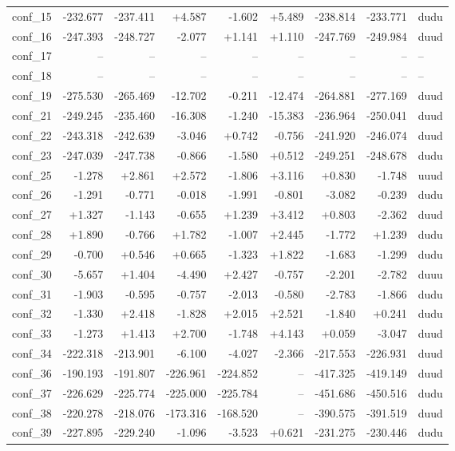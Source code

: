 \begin{longtable}{@{}lrrrrrrrl@{}}
conf\_15 & -232.677 & -237.411 & +4.587 & -1.602 & +5.489 & -238.814 & -233.771 & dudu \\
conf\_16 & -247.393 & -248.727 & -2.077 & +1.141 & +1.110 & -247.769 & -249.984 & duud \\
conf\_17 & -- & -- & -- & -- & -- & -- & -- & -- \\
conf\_18 & -- & -- & -- & -- & -- & -- & -- & -- \\
conf\_19 & -275.530 & -265.469 & -12.702 & -0.211 & -12.474 & -264.881 & -277.169 & duud \\
conf\_21 & -249.245 & -235.460 & -16.308 & -1.240 & -15.383 & -236.964 & -250.041 & duud \\
conf\_22 & -243.318 & -242.639 & -3.046 & +0.742 & -0.756 & -241.920 & -246.074 & duud \\
conf\_23 & -247.039 & -247.738 & -0.866 & -1.580 & +0.512 & -249.251 & -248.678 & dudu \\
conf\_25 & -1.278 & +2.861 & +2.572 & -1.806 & +3.116 & +0.830 & -1.748 & uuud \\
conf\_26 & -1.291 & -0.771 & -0.018 & -1.991 & -0.801 & -3.082 & -0.239 & dudu \\
conf\_27 & +1.327 & -1.143 & -0.655 & +1.239 & +3.412 & +0.803 & -2.362 & duud \\
conf\_28 & +1.890 & -0.766 & +1.782 & -1.007 & +2.445 & -1.772 & +1.239 & dudu \\
conf\_29 & -0.700 & +0.546 & +0.665 & -1.323 & +1.822 & -1.683 & -1.299 & dudu \\
conf\_30 & -5.657 & +1.404 & -4.490 & +2.427 & -0.757 & -2.201 & -2.782 & duuu \\
conf\_31 & -1.903 & -0.595 & -0.757 & -2.013 & -0.580 & -2.783 & -1.866 & dudu \\
conf\_32 & -1.330 & +2.418 & -1.828 & +2.015 & +2.521 & -1.840 & +0.241 & dudu \\
conf\_33 & -1.273 & +1.413 & +2.700 & -1.748 & +4.143 & +0.059 & -3.047 & duud \\
conf\_34 & -222.318 & -213.901 & -6.100 & -4.027 & -2.366 & -217.553 & -226.931 & duud \\
conf\_36 & -190.193 & -191.807 & -226.961 & -224.852 & -- & -417.325 & -419.149 & duud \\
conf\_37 & -226.629 & -225.774 & -225.000 & -225.784 & -- & -451.686 & -450.516 & dudu \\
conf\_38 & -220.278 & -218.076 & -173.316 & -168.520 & -- & -390.575 & -391.519 & duud \\
conf\_39 & -227.895 & -229.240 & -1.096 & -3.523 & +0.621 & -231.275 & -230.446 & dudu \\
\end{longtable}
